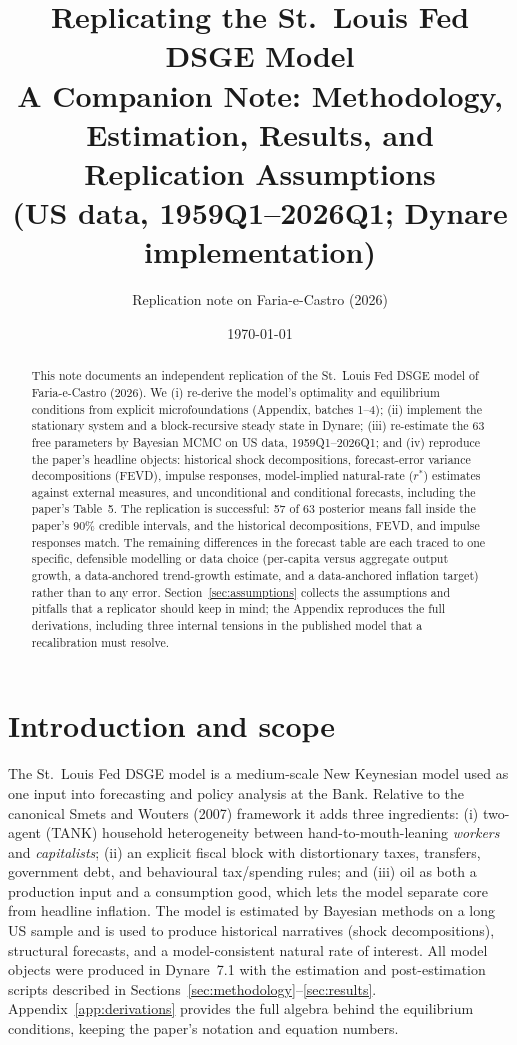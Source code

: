 \documentclass[11pt]{article}
\title{\vspace{-1.0em}Replicating the St.\ Louis Fed DSGE Model\\[0.3em]
\large A Companion Note: Methodology, Estimation, Results, and Replication Assumptions\\[0.2em]
\normalsize (US data, 1959Q1--2026Q1; Dynare implementation)}
\author{Replication note on Faria-e-Castro (2026)}
\date{\today}
\theoremstyle{definition}
\newcommand{\rstar}{r^{*}}
\begin{document}
\maketitle

\begin{abstract}
\noindent This note documents an independent replication of the St.\ Louis Fed DSGE model of
Faria-e-Castro (2026). We (i) re-derive the model's optimality and equilibrium conditions from explicit
microfoundations (Appendix, batches 1--4); (ii) implement the stationary system and a block-recursive
steady state in Dynare; (iii) re-estimate the 63 free parameters by Bayesian MCMC on US data,
1959Q1--2026Q1; and (iv) reproduce the paper's headline objects: historical shock decompositions,
forecast-error variance decompositions (FEVD), impulse responses, model-implied natural-rate ($\rstar$)
estimates against external measures, and unconditional and conditional forecasts, including the paper's
Table~5. The replication is successful: 57 of 63 posterior means fall inside the paper's 90\% credible
intervals, and the historical decompositions, FEVD, and impulse responses match. The remaining
differences in the forecast table are each traced to one specific, defensible modelling or data choice
(per-capita versus aggregate output growth, a data-anchored trend-growth estimate, and a
data-anchored inflation target) rather than to any error. Section~\ref{sec:assumptions} collects the
assumptions and pitfalls that a replicator should keep in mind; the Appendix reproduces the full
derivations, including three internal tensions in the published model that a recalibration must resolve.
\end{abstract}

\tableofcontents

\section{Introduction and scope}\label{sec:intro}
The St.\ Louis Fed DSGE model is a medium-scale New Keynesian model used as one input into forecasting
and policy analysis at the Bank. Relative to the canonical Smets and Wouters (2007) framework it adds
three ingredients: (i) two-agent (TANK) household heterogeneity between hand-to-mouth-leaning
\emph{workers} and \emph{capitalists}; (ii) an explicit fiscal block with distortionary taxes,
transfers, government debt, and behavioural tax/spending rules; and (iii) oil as both a production input
and a consumption good, which lets the model separate core from headline inflation. The model is
estimated by Bayesian methods on a long US sample and is used to produce historical narratives (shock
decompositions), structural forecasts, and a model-consistent natural rate of interest. All model objects were produced in Dynare~7.1 with
the estimation and post-estimation scripts described in Sections~\ref{sec:methodology}--\ref{sec:results}.
Appendix~\ref{app:derivations} provides the full algebra behind the equilibrium conditions, keeping the
paper's notation and equation numbers.
\end{document}
